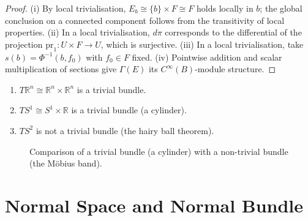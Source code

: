 \begin{proof}
(i) By local trivialisation, $E_b \cong \{b\} \times F \cong F$ holds locally in $b$; the global conclusion on a connected component follows from the transitivity of local properties.
(ii) In a local trivialisation, $d\pi$ corresponds to the differential of the projection $\text{pr}_1: U \times F \to U$, which is surjective.
(iii) In a local trivialisation, take $s(b) = \Phi^{-1}(b, f_0)$ with $f_0 \in F$ fixed.
(iv) Pointwise addition and scalar multiplication of sections give $\Gamma(E)$ its $C^\infty(B)$-module structure.
\end{proof}

\begin{example}\label{ex:trivial_nontrivial_bundle}
\begin{enumerate}[label=(\roman*)]
    \item $T\mathbb{R}^n \cong \mathbb{R}^n \times \mathbb{R}^n$ is a trivial bundle.
    \item $TS^1 \cong S^1 \times \mathbb{R}$ is a trivial bundle (a cylinder).
    \item $TS^2$ is not a trivial bundle (the hairy ball theorem).
\end{enumerate}
\end{example}

\begin{figure}[htbp]
\centering
{}
\caption{Comparison of a trivial bundle (a cylinder) with a non-trivial bundle (the M\"obius band).}
\label{fig:trivial_nontrivial}
\end{figure}

\section{Normal Space and Normal Bundle}

